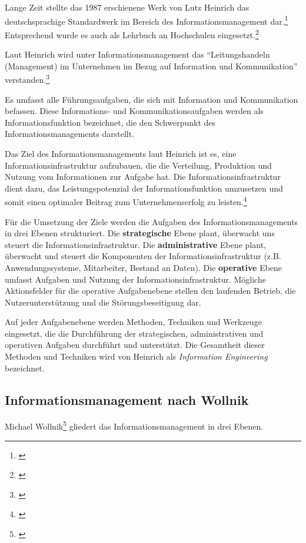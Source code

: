 Lange Zeit stellte das 1987 erschienene Werk von Lutz Heinrich das deutschsprachige Standardwerk im Bereich des Informationsmanagement dar.\footnote{\cite{heinrich_informationsmanagement_2005}} Entsprechend wurde es auch als Lehrbuch an Hochschulen eingesetzt.\footnote{\cite{heinrich_inm_2002}}

Laut Heinrich wird unter Informationsmanagement das “Leitungshandeln (Management) im Unternehmen im Bezug auf Information und Kommunikation” verstanden.\footnote{\cite{heinrich_informationsmanagement_2005}}

Es umfasst alle Führungsaufgaben, die sich mit Information und Kommunikation befassen. Diese Informations- und Kommunikationsaufgaben werden als Informationsfunktion bezeichnet, die den Schwerpunkt des Informationsmanagements darstellt. 

Das Ziel des Informationsmanagements laut Heinrich ist es, eine Informationsinfrastruktur aufzubauen, die die Verteilung, Produktion und Nutzung vom Informationen zur Aufgabe hat. Die Informationsinfrastruktur dient dazu, das Leistungspotenzial der Informationsfunktion umzusetzen und somit einen optimaler Beitrag zum Unternehmenserfolg zu leisten.\footnote{\cite{heinrich_inm_2002}}

Für die Umsetzung der Ziele werden die Aufgaben des Informationsmanagements in drei Ebenen strukturiert.
Die \textbf{strategische} Ebene plant, überwacht uns steuert die Informationsinfrastruktur.
Die \textbf{administrative} Ebene plant, überwacht und steuert die Komponenten der Informationsinfrastruktur (z.B. Anwendungssysteme, Mitarbeiter, Bestand an Daten).
Die \textbf{operative} Ebene umfasst Aufgaben und Nutzung der Informationsinfrastruktur. Mögliche Aktionsfelder für die operative Aufgabenebene stellen den laufenden Betrieb, die Nutzerunterstützung und die Störungsbeseitigung dar.

Auf jeder Aufgabenebene werden Methoden, Techniken und Werkzeuge eingesetzt, die die Durchführung 
der strategischen, administrativen und operativen Aufgaben durchführt und unterstützt.
Die Gesamtheit dieser Methoden und Techniken wird von Heinrich als \emph{Information Engineering} bezeichnet.

\subsection{Informationsmanagement nach Wollnik}
Michael Wollnik\footnote{\cite{wollnik_referenzmodell_1988}} gliedert das Informationsmanagement in drei Ebenen.


